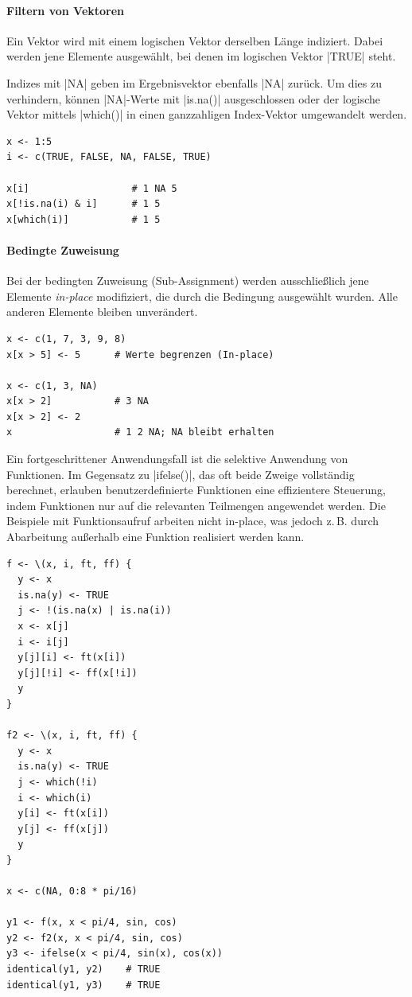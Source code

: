 \documentclass[10pt,twocolumn]{scrartcl}
\renewcommand{\lstinline}{\mycoloredinline}
\begin{document}
\paragraph{Filtern von Vektoren}

Ein Vektor wird mit einem logischen Vektor derselben Länge indiziert. Dabei werden jene Elemente ausgewählt, bei denen im logischen Vektor \lstinline|TRUE| steht.

Indizes mit \lstinline|NA| geben im Ergebnisvektor ebenfalls \lstinline|NA| zurück. Um dies zu verhindern, können \lstinline|NA|-Werte mit \lstinline|is.na()| ausgeschlossen oder der logische Vektor mittels \lstinline|which()| in einen ganzzahligen Index-Vektor umgewandelt werden.

\begin{lstlisting}
x <- 1:5
i <- c(TRUE, FALSE, NA, FALSE, TRUE)

x[i]                  # 1 NA 5
x[!is.na(i) & i]      # 1 5
x[which(i)]           # 1 5
\end{lstlisting}

\paragraph{Bedingte Zuweisung}

Bei der bedingten Zuweisung (Sub-Assignment) werden ausschließlich jene Elemente \emph{in-place} modifiziert, die durch die Bedingung ausgewählt wurden. Alle anderen Elemente bleiben unverändert.

\begin{lstlisting}
x <- c(1, 7, 3, 9, 8)
x[x > 5] <- 5      # Werte begrenzen (In-place)

x <- c(1, 3, NA)
x[x > 2]           # 3 NA
x[x > 2] <- 2
x                  # 1 2 NA; NA bleibt erhalten
\end{lstlisting}

Ein fortgeschrittener Anwendungsfall ist die selektive Anwendung von Funktionen. Im Gegensatz zu \lstinline|ifelse()|, das oft beide Zweige vollständig berechnet, erlauben benutzerdefinierte Funktionen eine effizientere Steuerung, indem Funktionen nur auf die relevanten Teilmengen angewendet werden. Die Beispiele mit Funktionsaufruf arbeiten nicht in-place, was jedoch z.\,B. durch Abarbeitung außerhalb eine Funktion realisiert werden kann.

\begin{lstlisting}
f <- \(x, i, ft, ff) {
  y <- x
  is.na(y) <- TRUE
  j <- !(is.na(x) | is.na(i))
  x <- x[j]
  i <- i[j]
  y[j][i] <- ft(x[i])
  y[j][!i] <- ff(x[!i])
  y
}

f2 <- \(x, i, ft, ff) {
  y <- x
  is.na(y) <- TRUE
  j <- which(!i)
  i <- which(i)
  y[i] <- ft(x[i])
  y[j] <- ff(x[j])
  y
}

x <- c(NA, 0:8 * pi/16)

y1 <- f(x, x < pi/4, sin, cos)
y2 <- f2(x, x < pi/4, sin, cos)
y3 <- ifelse(x < pi/4, sin(x), cos(x))
identical(y1, y2)    # TRUE
identical(y1, y3)    # TRUE
\end{lstlisting}
\end{document}
